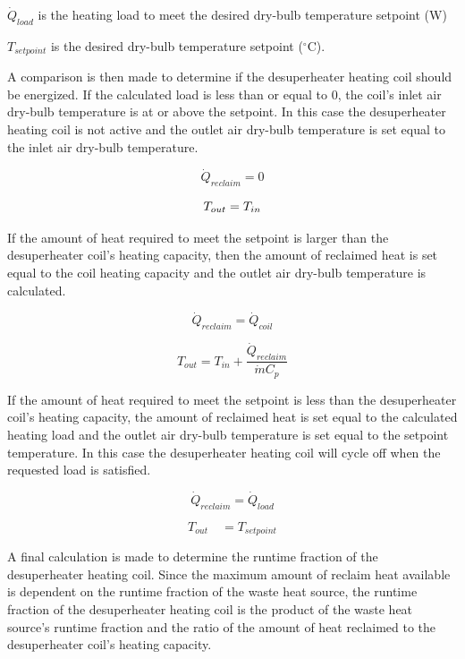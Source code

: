 \({\dot Q_{load}}\) is the heating load to meet the desired dry-bulb temperature setpoint (W)

\({T_{setpoint}}\) is the desired dry-bulb temperature setpoint (\(^{\circ}\)C).

A comparison is then made to determine if the desuperheater heating coil should be energized. If the calculated load is less than or equal to 0, the coil's inlet air dry-bulb temperature is at or above the setpoint. In this case the desuperheater heating coil is not active and the outlet air dry-bulb temperature is set equal to the inlet air dry-bulb temperature.

\begin{equation}
{\dot Q_{reclaim}} = 0
\end{equation}

\begin{equation}
{T_{out}}{\rm{ }} = {\rm{ }}{T_{in}}
\end{equation}

If the amount of heat required to meet the setpoint is larger than the desuperheater coil's heating capacity, then the amount of reclaimed heat is set equal to the coil heating capacity and the outlet air dry-bulb temperature is calculated.

\begin{equation}
{\dot Q_{reclaim}} = {\dot Q_{coil}}
\end{equation}

\begin{equation}
{T_{out}} = {T_{in}} + \frac{{{{\dot Q}_{reclaim}}}}{{\dot m{C_p}}}
\end{equation}

If the amount of heat required to meet the setpoint is less than the desuperheater coil's heating capacity, the amount of reclaimed heat is set equal to the calculated heating load and the outlet air dry-bulb temperature is set equal to the setpoint temperature. In this case the desuperheater heating coil will cycle off when the requested load is satisfied.

\begin{equation}
{\dot Q_{reclaim}} = {\dot Q_{load}}
\end{equation}

\begin{equation}
{T_{out}}\quad = {T_{setpoint}}
\end{equation}

A final calculation is made to determine the runtime fraction of the desuperheater heating coil. Since the maximum amount of reclaim heat available is dependent on the runtime fraction of the waste heat source, the runtime fraction of the desuperheater heating coil is the product of the waste heat source's runtime fraction and the ratio of the amount of heat reclaimed to the desuperheater coil's heating capacity.

